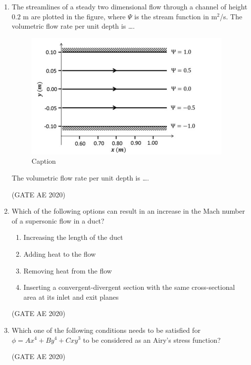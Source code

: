 \documentclass[journal,12pt,onecolumn]{IEEEtran}
\theoremstyle{remark}
\begin{document}
\begin{enumerate}
\item The streamlines of a steady two dimensional flow through a channel of height $0.2$ m are plotted in the figure, where $\Psi$ is the stream function in m$^2$/s. The volumetric flow rate per unit depth is \dots.
\begin{figure}[H]
    \centering
    \includegraphics[width=0.5\columnwidth]{figs/Screenshot from 2025-08-17 15-59-39.png}
    \caption{Caption}
    \label{fig:placeholder}
\end{figure}
The volumetric flow rate per unit depth is \dots.
    \begin{enumerate}
    \end{enumerate}
    \hfill(GATE AE 2020)

\item Which of the following options can result in an increase in the Mach number of a supersonic flow in a duct?
    \begin{enumerate}
        \item Increasing the length of the duct
        \item Adding heat to the flow
        \item Removing heat from the flow
        \item Inserting a convergent-divergent section with the same cross-sectional area at its inlet and exit planes
    \end{enumerate}
    \hfill(GATE AE 2020)

\item Which one of the following conditions needs to be satisfied for
    $
        \phi = Ax^4 + By^4 + Cx y^3
    $
    to be considered as an Airy's stress function?
    \begin{enumerate}
    \end{enumerate}
    \hfill(GATE AE 2020)


\end{enumerate}
\end{document}
